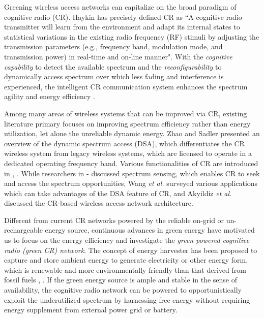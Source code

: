 \documentclass[journal,12pt,onecolumn]{IEEEtran}
\begin{document}
Greening wireless access networks can capitalize on the broad paradigm of cognitive radio (CR). Haykin \cite{Def} has precisely defined CR as ``A cognitive radio transmitter will learn from the environment and adapt its internal states to statistical variations in the existing radio frequency (RF) stimuli by adjusting the transmission parameters (e.g., frequency band, modulation mode, and transmission power) in real-time and on-line manner". With the \emph{cognitive capability} to detect the available spectrum and the \emph{reconfigurability} to dynamically access spectrum over which less fading and interference is experienced, the intelligent CR communication system enhances the spectrum agility and energy efficiency \cite{disertation}.

Among many areas of wireless systems that can be improved via CR, existing literature primary focuses on improving spectrum efficiency rather than energy utilization, let alone the unreliable dynamic energy. Zhao and Sadler \cite{threestrategies} presented an overview of the dynamic spectrum access (DSA), which differentiates the CR wireless system from legacy wireless systems, which are licensed to operate in a dedicated operating frequency band. Various functionalities of CR are introduced in \cite{Func}, \cite{SM}. While researchers in \cite{SSsingleDualRadio} - \cite{5703204} discussed spectrum sensing, which enables CR to seek and access the spectrum opportunities, Wang \emph{et al.} \cite{5723803} surveyed various applications which can take advantages of the DSA feature of CR, and Akyildiz \emph{et al.} \cite{HO} discussed the CR-based wireless access network architecture.
 
Different from current CR networks powered by the reliable on-grid or un-rechargeable energy source, continuous advances in green energy have motivated us to focus on the energy efficiency and investigate the \emph{green powered cognitive radio (green CR) network}. The concept of energy harvester has been proposed to capture and store ambient energy to generate electricity or other energy form, which is renewable and more environmentally friendly than that derived from fossil fuels \cite{RF}, \cite{RFHARVESTOR}. If the green energy source is ample and stable in the sense of availability, the cognitive radio network can be powered to opportunistically exploit the underutilized spectrum by harnessing free energy without requiring energy supplement from external power grid or battery.
\end{document}
